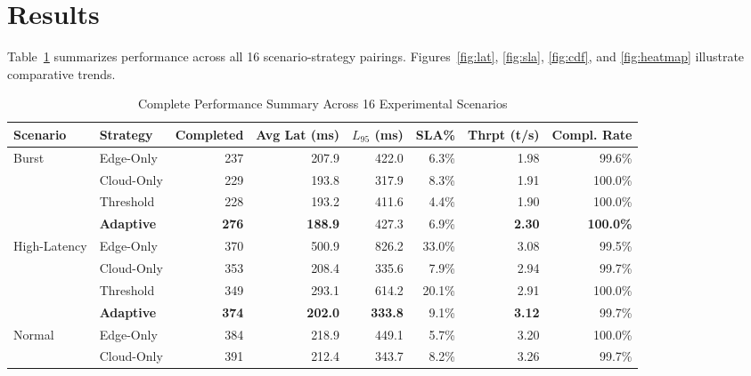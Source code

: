 \documentclass[conference]{IEEEtran}
\begin{document}
\section{Results}
\label{sec:results}

Table~\ref{tab:results} summarizes performance across all 16 scenario-strategy pairings. Figures~\ref{fig:lat}, \ref{fig:sla}, \ref{fig:cdf}, and \ref{fig:heatmap} illustrate comparative trends.

\begin{table}[t]
\centering
\caption{Complete Performance Summary Across 16 Experimental Scenarios}
\label{tab:results}
\begin{tabular}{llrrrrrr}
\toprule
\textbf{Scenario} & \textbf{Strategy} &
\textbf{Completed} & \textbf{Avg Lat (ms)} & \textbf{$L_{95}$ (ms)} &
\textbf{SLA\%} & \textbf{Thrpt (t/s)} & \textbf{Compl. Rate} \\
\midrule
\multirow{4}{*}{Burst}
  & Edge-Only            & 237          & 207.9          & 422.0          & 6.3\%          & 1.98          & 99.6\% \\
  & Cloud-Only           & 229          & 193.8          & 317.9          & 8.3\%          & 1.91          & 100.0\% \\
  & Threshold            & 228          & 193.2          & 411.6          & 4.4\%          & 1.90          & 100.0\% \\
  & \textbf{Adaptive}    & \textbf{276} & \textbf{188.9} & 427.3          & 6.9\%          & \textbf{2.30} & \textbf{100.0\%} \\
\midrule
\multirow{4}{*}{High-Latency}
  & Edge-Only            & 370          & 500.9          & 826.2          & 33.0\%         & 3.08          & 99.5\% \\
  & Cloud-Only           & 353          & 208.4          & 335.6          & 7.9\%          & 2.94          & 99.7\% \\
  & Threshold            & 349          & 293.1          & 614.2          & 20.1\%         & 2.91          & 100.0\% \\
  & \textbf{Adaptive}    & \textbf{374} & \textbf{202.0} & \textbf{333.8} & 9.1\%          & \textbf{3.12} & 99.7\% \\
\midrule
\multirow{4}{*}{Normal}
  & Edge-Only            & 384          & 218.9          & 449.1          & 5.7\%          & 3.20          & 100.0\% \\
  & Cloud-Only           & 391          & 212.4          & 343.7          & 8.2\%          & 3.26          & 99.7\% \\

\end{tabular}
\end{table}
\end{document}
